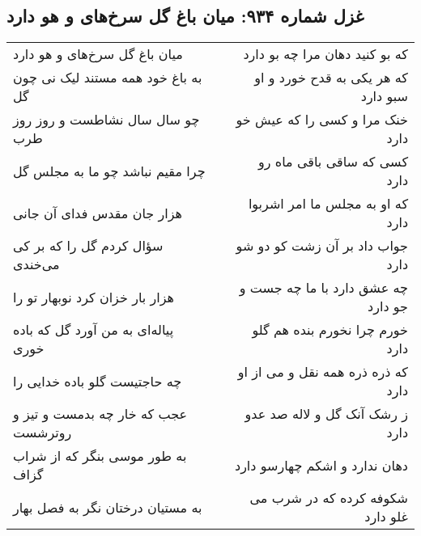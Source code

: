 \begin{center}
\section*{غزل شماره ۹۳۴: میان باغ گل سرخ‌های و هو دارد}
\label{sec:0934}
\begin{longtable}{l p{0.5cm} r}
میان باغ گل سرخ‌های و هو دارد
&&
که بو کنید دهان مرا چه بو دارد
\\
به باغ خود همه مستند لیک نی چون گل
&&
که هر یکی به قدح خورد و او سبو دارد
\\
چو سال سال نشاطست و روز روز طرب
&&
خنک مرا و کسی را که عیش خو دارد
\\
چرا مقیم نباشد چو ما به مجلس گل
&&
کسی که ساقی باقی ماه رو دارد
\\
هزار جان مقدس فدای آن جانی
&&
که او به مجلس ما امر اشربوا دارد
\\
سؤال کردم گل را که بر کی می‌خندی
&&
جواب داد بر آن زشت کو دو شو دارد
\\
هزار بار خزان کرد نوبهار تو را
&&
چه عشق دارد با ما چه جست و جو دارد
\\
پیاله‌ای به من آورد گل که باده خوری
&&
خورم چرا نخورم بنده هم گلو دارد
\\
چه حاجتیست گلو باده خدایی را
&&
که ذره ذره همه نقل و می از او دارد
\\
عجب که خار چه بدمست و تیز و روترشست
&&
ز رشک آنک گل و لاله صد عدو دارد
\\
به طور موسی بنگر که از شراب گزاف
&&
دهان ندارد و اشکم چهارسو دارد
\\
به مستیان درختان نگر به فصل بهار
&&
شکوفه کرده که در شرب می غلو دارد
\\
\end{longtable}
\end{center}

